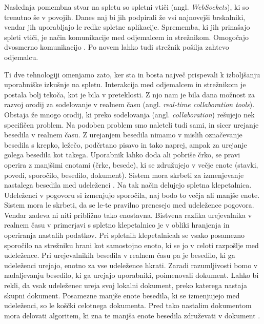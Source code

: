 \documentclass[a4paper, 12pt, twoside]{book}
\begin{document}
Naslednja pomembna stvar na spletu so spletni vtiči (angl. \textit{WebSockets}), ki so trenutno še v povojih. Danes naj bi jih podpirali že vsi najnovejši brskalniki, vendar jih uporabljajo le redke spletne aplikacije. Sprememba, ki jih prinašajo spleti vtiči, je način komunikacije med odjemalcem in strežnikom. Omogočajo dvosmerno komunikacijo \cite{wave-cs}. Po novem lahko tudi strežnik pošilja zahtevo odjemalcu.

Ti dve tehnologiji omenjamo zato, ker sta in bosta največ prispevali k izboljšanju uporabniške izkušnje na spletu. Interakcija med odjemalcem in strežnikom je postala bolj tekoča, kot je bila v preteklosti. Z njo nam je bila dana možnost za razvoj orodij za sodelovanje v realnem času (angl. \textit{real-time collaboration tools}). Obstaja že mnogo orodij, ki preko sodelovanja (angl. \textit{collaboration}) rešujejo nek specifičen problem. Na podoben problem smo naleteli tudi sami, in sicer urejanje besedila v realnem času. Z urejanjem besedila nimamo v mislih označevanje besedila s krepko, ležečo, podčrtano pisavo in tako naprej, ampak za urejanje golega besedila kot takega. Uporabnik lahko doda ali pobriše črko, se pravi operira z manjšimi enotami (črke, besede), ki se združujejo v večje enote (stavki, povedi, sporočilo, besedilo, dokument). Sistem mora skrbeti za izmenjevanje nastalega besedila med udeleženci \cite{gdocs23}. Na tak način delujejo spletna klepetalnica. Udeleženci v pogovoru si izmenjujo sporočila, naj bodo to večja ali manjše enote. Sistem mora le skrbeti, da se le-te pravilno prenesejo med udeležence pogovora. Vendar zadeva ni niti približno tako enostavna. Bistvena razlika urejevalnika v realnem času v primerjavi s spletno klepetalnico je v obliki hranjenja in operiranja nastalih podatkov. Pri spletnih klepetalnicah se vsako posamezno sporočilo na strežniku hrani kot samostojno enoto, ki se jo v celoti razpošlje med udeležence. Pri urejevalnikih besedila v realnem času pa je besedilo, ki ga udeleženci urejajo, enotno za vse udeležence hkrati. Zaradi razumljivosti bomo v nadaljevanju besedilo, ki ga urejajo uporabniki, poimenovali dokument. Lahko bi rekli, da vsak udeleženec ureja svoj lokalni dokument, preko katerega nastaja skupni dokument. Posamezne manjše enote besedila, ki se izmenjujejo med udeleženci, so le koščki celotnega dokumenta. Pred tako nastalim dokumentom mora delovati algoritem, ki zna te manjša enote besedila združevati v dokument \cite{gdocs22}.

\end{document}
